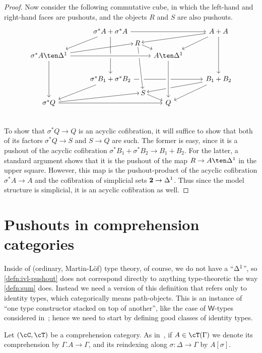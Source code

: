 \documentclass{amsart}
\let\C\cC
\let\T\cT
\begin{document}
\begin{proof}
  Now consider the following commutative cube, in which the left-hand and right-hand faces are pushouts, and the objects $R$ and $S$ are also pushouts.
  \[\begin{tikzcd}
    & \sigma^* A+\sigma^*A \arrow[dl] \arrow[rr] \arrow[dd] \ar[dr,phantom,"R"{name=sr}]
    & & A+A \arrow[dl] \arrow[dd] \ar[to=sr] \\
    \sigma^*A\ten\ivl\arrow[dd] \ar[to=sr] & & A\ten\ivl \ar[from=sr] \\
    & \sigma^*B_1+\sigma^*B_2 \arrow[dl] \arrow[rr] \ar[dr,phantom,"S"{name=tr}]
    \ar[from=sr,to=tr,crossing over]
    \arrow[from=ul,to=ur, crossing over]
    & & B_1+B_2 \arrow[dl] \ar[to=tr] \\
    \sigma^*Q \arrow[rr] \ar[to=tr] & & Q \arrow[from=uu, crossing over]
    \ar[from=tr] \\
  \end{tikzcd}\]
  To show that $\sigma^*Q \to Q$ is an acyclic cofibration, it will suffice to show that both of its factors $\sigma^*Q\to S$ and $S\to Q$ are such.
  The former is easy, since it is a pushout of the acyclic cofibration ${\sigma^*B_1 +\sigma^*B_2} \to B_1+B_2$.
  For the latter, a standard argument shows that it is the pushout of the map $R\to A\ten\ivl$ in the upper square.
  However, this map is the pushout-product of the acyclic cofibration $\sigma^*A\to A$ and the cofibration of simplicial sets $\mathbf{2}\to{\Delta^1}$.
  Thus since the model structure is simplicial, it is an acyclic cofibration as well.
\end{proof}


\section{Pushouts in comprehension categories}
\label{sec:coherence-pushouts}

Inside of (ordinary, Martin-L\"of) type theory, of course, we do not have a ``${\Delta^1}$'', so \cref{defn:ivl-pushout} does not correspond directly to anything type-theoretic the way \cref{defn:sum} does.
Instead we need a version of this definition that refers only to identity types, which categorically means path-objects.
This is an instance of ``one type constructor stacked on top of another'', like the case of $\mathsf{W}$-types considered in~\cite[\S3.4.4]{lw:localuniv}; hence we need to start by defining good classes of identity types.

Let $(\C,\T)$ be a comprehension category.
As in~\cite{lw:localuniv}, if $A\in\T(\Gamma)$ we denote its comprehension by $\Gamma.A\to\Gamma$, and its reindexing along $\sigma:\Delta\to\Gamma$ by $A[\sigma]$.
\end{document}
